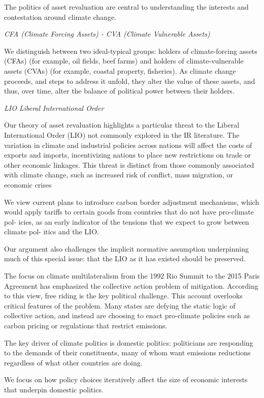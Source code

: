 \documentclass[
]{book}
\begin{document}
The politics of asset revaluation are central to understanding the interests
and contestation around climate change.

\emph{CFA (Climate Forcing Assets) - CVA (Climate Vulnerable Assets)}

We distinguish between two ideal-typical groups: holders of climate-forcing assets
(CFAs) (for example, oil fields, beef farms) and holders of climate-vulnerable assets
(CVAs) (for example, coastal property, fisheries). As climate change proceeds, and
steps to address it unfold, they alter the value of these assets, and thus, over time,
alter the balance of political power between their holders.

\emph{LIO Liberal International Order}

Our theory of asset revaluation highlights a particular threat to the Liberal
International Order (LIO) not commonly explored in the IR literature. The variation
in climate and industrial policies across nations will affect the costs of exports and
imports, incentivizing nations to place new restrictions on trade or other economic
linkages. This threat is distinct from those commonly associated with climate
change, such as increased risk of conflict, mass migration, or economic crises

We view current plans to introduce carbon border adjustment mechanisms, which
would apply tariffs to certain goods from countries that do not have pro-climate pol-
icies, as an early indicator of the tensions that we expect to grow between climate pol-
itics and the LIO.

Our argument also challenges the implicit normative assumption underpinning
much of this special issue: that the LIO as it has existed should be preserved.

The focus on climate multilateralism from the 1992 Rio Summit to the 2015 Paris
Agreement has emphasized the collective action problem of mitigation. According to
this view, free riding is the key political challenge. This account overlooks critical
features of the problem.
Many states are defying the static logic of collective
action, and instead are choosing to enact pro-climate policies such as carbon
pricing or regulations that restrict emissions.

The key driver of climate politics is domestic politics:
politicians are responding to the demands of their constituents,
many of whom want emissions reductions regardless of what other countries
are doing.

We focus on how policy choices iteratively affect
the size of economic interests that underpin domestic politics.
\end{document}
